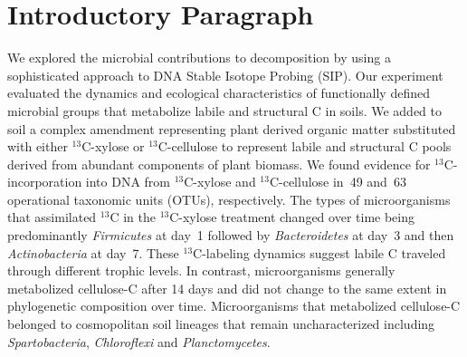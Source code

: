 \section{Introductory Paragraph} We explored the microbial contributions to
decomposition by using a sophisticated approach to DNA Stable Isotope Probing
(SIP). Our experiment evaluated the dynamics and ecological characteristics of
functionally defined microbial groups that metabolize labile and structural C
in soils. We added to soil a complex amendment representing plant derived
organic matter substituted with either  $^{13}$C-xylose or $^{13}$C-cellulose
to represent labile and structural C pools derived from abundant components of
plant biomass. We found evidence for $^{13}$C-incorporation into DNA from
$^{13}$C-xylose and $^{13}$C-cellulose in~49 and~63 operational taxonomic
units (OTUs), respectively. The types of microorganisms that assimilated
$^{13}$C in the $^{13}$C-xylose treatment changed over time being predominantly
\textit{Firmicutes} at day~1 followed by \textit{Bacteroidetes} at day~3 and
then \textit{Actinobacteria} at day~7. These $^{13}$C-labeling dynamics 
suggest labile C traveled through different trophic levels. In contrast,
microorganisms generally metabolized cellulose-C after 14 days and did not
change to the same extent in phylogenetic composition over time. Microorganisms
that metabolized cellulose-C belonged to cosmopolitan soil lineages that remain
uncharacterized including \textit{Spartobacteria}, \textit{Chloroflexi} and
\textit{Planctomycetes}.
